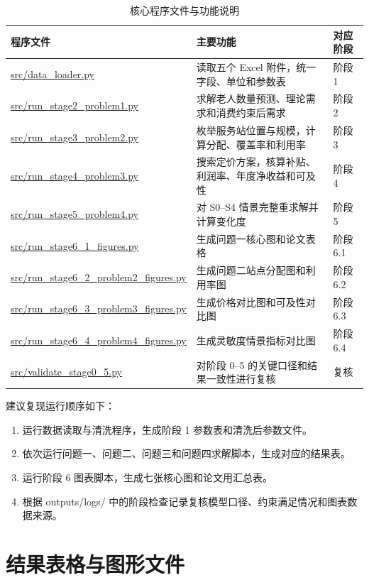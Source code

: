 \begin{table}[H]
  \centering
  \caption{核心程序文件与功能说明}
  \label{tab:appendix-code-index}
  \small
  \renewcommand{\arraystretch}{1.18}
  \setlength{\tabcolsep}{3pt}
  \begin{tabular}{p{}p{}p{}}
    \toprule
    程序文件 & 主要功能 & 对应阶段 \\
    \midrule
    \url{src/data_loader.py} & 读取五个 Excel 附件，统一字段、单位和参数表 & 阶段 1 \\
    \url{src/run_stage2_problem1.py} & 求解老人数量预测、理论需求和消费约束后需求 & 阶段 2 \\
    \url{src/run_stage3_problem2.py} & 枚举服务站位置与规模，计算分配、覆盖率和利用率 & 阶段 3 \\
    \url{src/run_stage4_problem3.py} & 搜索定价方案，核算补贴、利润率、年度净收益和可及性 & 阶段 4 \\
    \url{src/run_stage5_problem4.py} & 对 S0--S4 情景完整重求解并计算变化度 & 阶段 5 \\
    \url{src/run_stage6_1_figures.py} & 生成问题一核心图和论文表格 & 阶段 6.1 \\
    \url{src/run_stage6_2_problem2_figures.py} & 生成问题二站点分配图和利用率图 & 阶段 6.2 \\
    \url{src/run_stage6_3_problem3_figures.py} & 生成价格对比图和可及性对比图 & 阶段 6.3 \\
    \url{src/run_stage6_4_problem4_figures.py} & 生成灵敏度情景指标对比图 & 阶段 6.4 \\
    \url{src/validate_stage0_5.py} & 对阶段 0--5 的关键口径和结果一致性进行复核 & 复核 \\
    \bottomrule
  \end{tabular}
\end{table}

建议复现运行顺序如下：
\begin{enumerate}
  \item 运行数据读取与清洗程序，生成阶段 1 参数表和清洗后参数文件。
  \item 依次运行问题一、问题二、问题三和问题四求解脚本，生成对应的结果表。
  \item 运行阶段 6 图表脚本，生成七张核心图和论文用汇总表。
  \item 根据 outputs/logs/ 中的阶段检查记录复核模型口径、约束满足情况和图表数据来源。
\end{enumerate}

\section{结果表格与图形文件}

